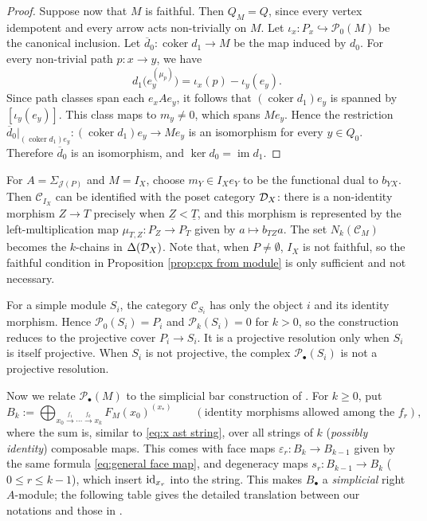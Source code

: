 \documentclass[a4paper,leqno]{amsart}
\begin{document}
\begin{proof}
Suppose now that $M$ is faithful. Then $Q_M=Q$, since every vertex idempotent and every arrow acts non-trivially on $M$. Let $\iota_x:P_x\hookrightarrow\mathcal P_0(M)$ be the canonical inclusion. Let $\overline{d}_0:\operatorname{coker}d_1\to M$ be the map induced by $d_0$. For every non-trivial path $p:x\to y$, we have
\[
d_1\bigl(e_y^{(\mu_p)}\bigr)
=\iota_x(p)-\iota_y(e_y).
\]
Since path classes span each $e_xAe_y$, it follows that $(\operatorname{coker}d_1)e_y$ is spanned by $[\iota_y(e_y)]$. This class maps to $m_y\neq0$, which spans $Me_y$. Hence the restriction $\overline{d}_0|_{(\operatorname{coker}d_1)e_y}:(\operatorname{coker}d_1)e_y\to Me_y$
is an isomorphism for every $y\in Q_0$. Therefore $\overline{d}_0$ is an isomorphism, and $\ker d_0=\operatorname{im}d_1$.
\end{proof}

\begin{eg}\label{eg:DX is C_IX}
For $A=\Sigma_{\mathcal J(P)}$ and $M=I_X$, choose $m_Y\in I_Xe_Y$ to be the functional dual to $b_{YX}$.  Then $\mathcal C_{I_X}$ can be identified with the poset category $\mathcal D_X$: there is a non-identity morphism $Z\to T$ precisely when $\underline{Z}<\underline{T}$, and this morphism is represented by the left-multiplication map $\mu_{T,Z}:P_Z\to P_T$ given by $a\mapsto b_{TZ}a$. The set $N_k(\mathcal{C}_M)$ becomes the $k$-chains in $\Delta(\mathcal D_X)$.
Note that, when $P\neq\emptyset$, $I_X$ is not faithful, so the faithful condition in Proposition \ref{prop:cpx from module} is only sufficient and not necessary.
\end{eg}

\begin{eg}\label{eg:non exact cpx from simple}
For a simple module $S_i$, the category $\mathcal C_{S_i}$ has only the object $i$ and its identity morphism. Hence $\mathcal P_0(S_i)=P_i$ and $\mathcal P_k(S_i)=0$ for $k>0$, so the construction reduces to the projective cover $P_i\to S_i$.  It is a projective resolution only when $S_i$ is itself projective. When $S_i$ is not projective, the complex $\mathcal P_\bullet(S_i)$ is not a projective resolution.
\end{eg}


Now we relate $\mathcal P_\bullet(M)$ to the simplicial bar construction of \cite[Definition~4.2.1]{Rie14}.  For $k\geq0$, put
\[
B_k:=\bigoplus_{x_0\xrightarrow{f_1}\cdots\xrightarrow{f_k}x_k}F_M(x_0)^{(x_\ast)}
 \qquad(\text{identity morphisms allowed among the }f_r),
\]
where the sum is, similar to \eqref{eq:x ast string}, over all strings of $k$ (\emph{possibly identity}) composable maps. 
This comes with face maps $\varepsilon_r\colon B_k\to B_{k-1}$ given by the same formula \eqref{eq:general face map}, and degeneracy maps $s_r\colon B_{k-1}\to B_k$ ($0\leq r\leq k-1$), which insert $\operatorname{id}_{x_r}$ into the string. 
This makes $B_\bullet$ a \emph{simplicial} right $A$-module; the following table gives the detailed translation between our notations and those in \cite{Rie14}.
\end{document}
